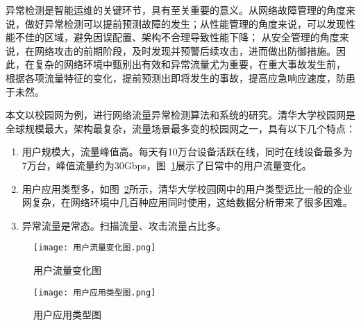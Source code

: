 异常检测是智能运维的关键环节，具有至关重要的意义。从网络故障管理的角度来说，做好异常检测可以提前预测故障的发生；从性能管理的角度来说，可以发现性能不佳的区域，避免因误配置、架构不合理导致性能下降；
从安全管理的角度来说，在网络攻击的前期阶段，及时发现并预警后续攻击，进而做出防御措施。因此，在复杂的网络环境中甄别出有效和异常流量尤为重要，在重大事故发生前，
根据各项流量特征的变化，提前预测出即将发生的事故，提高应急响应速度，防患于未然。


本文以校园网为例，进行网络流量异常检测算法和系统的研究。清华大学校园网是全球规模最大，架构最复杂，流量场景最多变的校园网之一，具有以下几个特点：
\begin{enumerate}
    \item 用户规模大，流量峰值高。每天有10万台设备活跃在线，同时在线设备最多为7万台，峰值流量约为30Gbps，图~\ref{fig:用户流量变化图}展示了日常中的用户流量变化。
    \item	用户应用类型多，如图~\ref{fig:用户应用类型图}所示，清华大学校园网中的用户类型远比一般的企业网复杂，在网络环境中几百种应用同时使用，这给数据分析带来了很多困难。
    \item	异常流量是常态。扫描流量、攻击流量占比多。
\end{enumerate}

\begin{figure}
  \centering
  \texttt{[image: 用户流量变化图.png]}
  \caption{用户流量变化图}
  \label{fig:用户流量变化图}
\end{figure}

\begin{figure}
  \centering
  \texttt{[image: 用户应用类型图.png]}
  \caption{用户应用类型图}
  \label{fig:用户应用类型图}
\end{figure}



